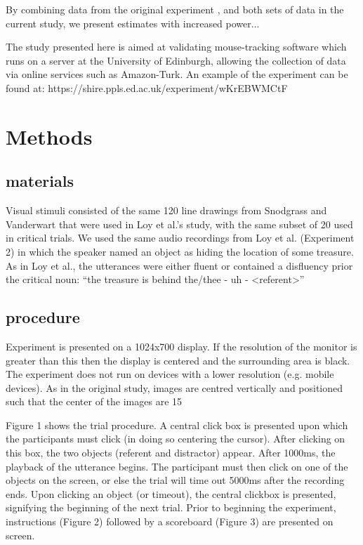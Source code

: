 \documentclass[a4paper,man,natbib]{apa6}
\begin{document}
By combining data from the original experiment \cite{Loy2017}, and both sets of data in the current study, we present estimates with increased power... 

The study presented here is aimed at validating mouse-tracking software which runs on a server at the University of Edinburgh, allowing the collection of data via online services such as Amazon-Turk. An example of the experiment can be found at: 
https://shire.ppls.ed.ac.uk/experiment/wKrEBWMCtF


\section*{Methods}

\subsection*{materials}  

Visual stimuli consisted of the same 120 line drawings from Snodgrass and Vanderwart that were used in Loy et al.’s study, with the same subset of 20 used in critical trials. 
We used the same audio recordings from Loy et al. (Experiment 2) in which the speaker named an object as hiding the location of some treasure. As in Loy et al., the utterances were either fluent or contained a disfluency prior the critical noun:
“the treasure is behind the/thee - uh - <referent>”

\subsection*{procedure}

Experiment is presented on a 1024x700 display. If the resolution of the monitor is greater than this then the display is centered and the surrounding area is black. The experiment does not run on devices with a lower resolution (e.g. mobile devices). As in the original study, images are centred vertically and positioned such that the center of the images are 15%

Figure 1 shows the trial procedure.
A central click box is presented upon which the participants must click (in doing so centering the cursor).
After clicking on this box, the two objects (referent and distractor) appear.
After 1000ms, the playback of the utterance begins. 
The participant must then click on one of the objects on the screen, or else the trial will time out 5000ms after the recording ends. 
Upon clicking an object (or timeout), the central clickbox is presented, signifying the beginning of the next trial.
Prior to beginning the experiment, instructions (Figure 2) followed by a scoreboard (Figure 3) are presented on screen.
\end{document}
